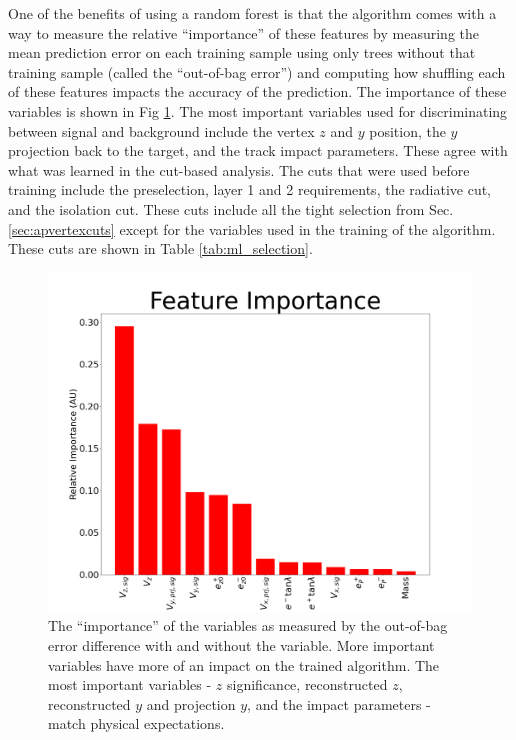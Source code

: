 One of the benefits of using a random forest is that the algorithm comes with a way to measure the relative ``importance'' of these features by measuring the mean prediction error on each training sample using only trees without that training sample (called the ``out-of-bag error'') and computing how shuffling each of these features impacts the accuracy of the prediction. The importance of these variables is shown in Fig \ref{fig:importances}. The most important variables used for discriminating between signal and background include the vertex $z$ and $y$ position, the $y$ projection back to the target, and the track impact parameters. These agree with what was learned in the cut-based analysis. The cuts that were used before training include the preselection, layer 1 and 2 requirements, the radiative cut, and the isolation cut. These cuts include all the tight selection from Sec. \ref{sec:apvertexcuts} except for the variables used in the training of the algorithm. These cuts are shown in Table \ref{tab:ml_selection}. 

\begin{figure}[t]
    \centering
    \includegraphics[width=.85\textwidth]{figs/Results/importances_final.png}
    \caption{The ``importance'' of the variables as measured by the out-of-bag error difference with and without the variable. More important variables have more of an impact on the trained algorithm. The most important variables - $z$ significance, reconstructed $z$, reconstructed $y$ and projection $y$, and the impact parameters - match physical expectations.
    }
    \label{fig:importances}
\end{figure}


